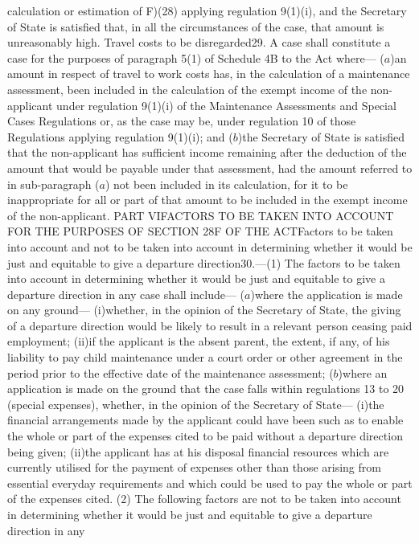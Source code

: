 \documentclass[a4paper]{article}
\begin{document}
calculation or estimation of F)(28) applying regulation 9(1)(i), and the
Secretary of State is satisfied that, in all the circumstances of the case, that
amount is unreasonably high.
Travel costs to be disregarded29. A case shall constitute a case for the
purposes of paragraph 5(1) of Schedule 4B to the Act where—
($a$)an amount in respect of travel to work costs has, in the calculation of a
maintenance assessment, been included in the calculation of the exempt income of
the non-applicant under regulation 9(1)(i) of the Maintenance Assessments and
Special Cases Regulations or, as the case may be, under regulation 10 of those
Regulations applying regulation 9(1)(i); and
($b$)the Secretary of State is satisfied that the non-applicant has sufficient
income remaining after the deduction of the amount that would be payable under
that assessment, had the amount referred to in sub-paragraph ($a$) not been
included in its calculation, for it to be inappropriate for all or part of that
amount to be included in the exempt income of the non-applicant.
PART VIFACTORS TO BE TAKEN INTO ACCOUNT FOR THE PURPOSES OF SECTION 28F OF THE
ACTFactors to be taken into account and not to be taken into account in
determining whether it would be just and equitable to give a departure
direction30.—(1) The factors to be taken into account in determining whether it
would be just and equitable to give a departure direction in any case shall
include—
($a$)where the application is made on any ground—
(i)whether, in the opinion of the Secretary of State, the giving of a departure
direction would be likely to result in a relevant person ceasing paid
employment;
(ii)if the applicant is the absent parent, the extent, if any, of his liability
to pay child maintenance under a court order or other agreement in the period
prior to the effective date of the maintenance assessment;
($b$)where an application is made on the ground that the case falls within
regulations 13 to 20 (special expenses), whether, in the opinion of the
Secretary of State—
(i)the financial arrangements made by the applicant could have been such as to
enable the whole or part of the expenses cited to be paid without a departure
direction being given;
(ii)the applicant has at his disposal financial resources which are currently
utilised for the payment of expenses other than those arising from essential
everyday requirements and which could be used to pay the whole or part of the
expenses cited.
(2) The following factors are not to be taken into account in determining
whether it would be just and equitable to give a departure direction in any
\end{document}
